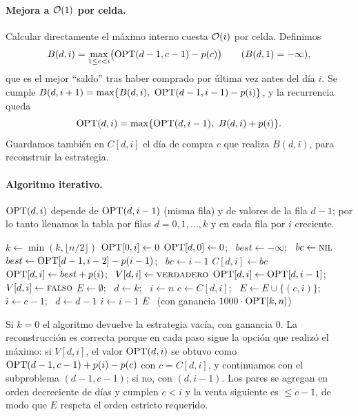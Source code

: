 \paragraph{Mejora a $\mathcal{O}(1)$ por celda.} Calcular directamente el máximo interno cuesta $\mathcal{O}(i)$ por celda.
Definimos
\[
B(d,i)=\max_{1\le c<i}\bigl(\mathrm{OPT}(d-1,c-1)-p(c)\bigr) \qquad(B(d,1)=-\infty),
\]
que es el mejor ``saldo'' tras haber comprado por última vez antes del día $i$. Se cumple
$B(d,i+1)=\max\{B(d,i),\ \OPT(d-1,i-1)-p(i)\}$, y la recurrencia queda
\[
\OPT(d,i)=\max\{\OPT(d,i-1),\ B(d,i)+p(i)\}.
\]
Guardamos también en $C[d,i]$ el día de compra $c$ que realiza $B(d,i)$, para reconstruir la estrategia.

\paragraph{Algoritmo iterativo.} $\mathrm{OPT}(d,i)$ depende de $\mathrm{OPT}(d,i-1)$ (misma fila) y de valores de la fila
$d-1$; por lo tanto llenamos la tabla por filas $d=0,1,\dots,k$ y en cada fila por $i$ creciente.

\begin{algorithm}[H]
\caption{KDisparos$(p(1..n),k)$}
\begin{algorithmic}[1]
\State $k \gets \min(k,\lfloor n/2\rfloor)$ 
 $\mathrm{OPT}[0,i]\gets 0$ \EndFor
{}
  \State $\mathrm{OPT}[d,0]\gets 0$; \ $best\gets -\infty$; \ $bc \gets \textsc{nil}$
     
      \State $best \gets \mathrm{OPT}[d-1,i-2]-p(i-1)$; \ $bc\gets i-1$
    \EndIf
    \State $C[d,i]\gets bc$ 
      \State $\mathrm{OPT}[d,i]\gets best+p(i)$; \ $V[d,i]\gets \textsc{verdadero}$ 
    \Else
      \State $\mathrm{OPT}[d,i]\gets \mathrm{OPT}[d,i-1]$; \ $V[d,i]\gets\textsc{falso}$
    \EndIf
  \EndFor
\EndFor
\State {}
\State $E\gets\emptyset$; \ $d\gets k$; \ $i\gets n$
    \State $c\gets C[d,i]$; \ $E\gets E\cup\{(c,i)\}$; \ $i\gets c-1$; \ $d\gets d-1$
  \Else
    \State $i\gets i-1$
  \EndIf
\EndWhile
\State \Return $E$ \ (con ganancia $1000\cdot\mathrm{OPT}[k,n]$)
\end{algorithmic}
\end{algorithm}

Si $k=0$ el algoritmo devuelve la estrategia vacía, con ganancia $0$. La reconstrucción es correcta porque
en cada paso sigue la opción que realizó el máximo: si $V[d,i]$, el valor $\mathrm{OPT}(d,i)$ se obtuvo como
$\mathrm{OPT}(d-1,c-1)+p(i)-p(c)$ con $c=C[d,i]$, y continuamos con el subproblema $(d-1,c-1)$; si no, con $(d,i-1)$.
Los pares se agregan en orden decreciente de días y cumplen $c<i$ y la venta siguiente es $\le c-1$, de modo
que $E$ respeta el orden estricto requerido.


